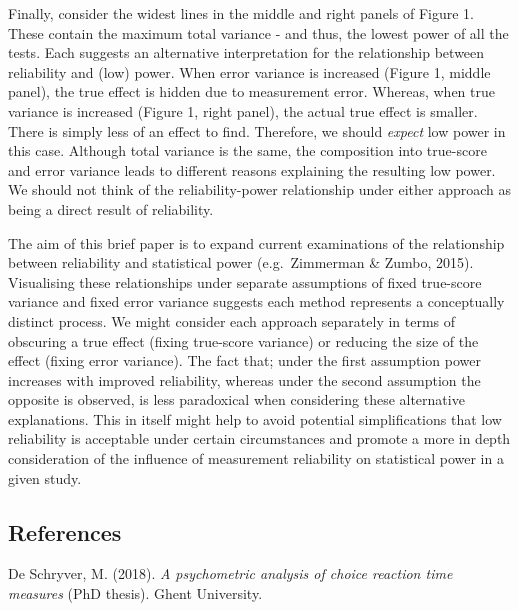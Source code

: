 \documentclass[english,,man]{apa6}
\begin{document}
Finally, consider the widest lines in the middle and right panels of Figure 1. These contain the maximum total variance - and thus, the lowest power of all the tests. Each suggests an alternative interpretation for the relationship between reliability and (low) power. When error variance is increased (Figure 1, middle panel), the true effect is hidden due to measurement error. Whereas, when true variance is increased (Figure 1, right panel), the actual true effect is smaller. There is simply less of an effect to find. Therefore, we should \emph{expect} low power in this case. Although total variance is the same, the composition into true-score and error variance leads to different reasons explaining the resulting low power. We should not think of the reliability-power relationship under either approach as being a direct result of reliability.

The aim of this brief paper is to expand current examinations of the relationship between reliability and statistical power (e.g.~Zimmerman \& Zumbo, 2015). Visualising these relationships under separate assumptions of fixed true-score variance and fixed error variance suggests each method represents a conceptually distinct process. We might consider each approach separately in terms of obscuring a true effect (fixing true-score variance) or reducing the size of the effect (fixing error variance). The fact that; under the first assumption power increases with improved reliability, whereas under the second assumption the opposite is observed, is less paradoxical when considering these alternative explanations. This in itself might help to avoid potential simplifications that low reliability is acceptable under certain circumstances and promote a more in depth consideration of the influence of measurement reliability on statistical power in a given study.

\pagebreak

\hypertarget{references}{%
\subsection{References}\label{references}}

\setlength{\parindent}{-0.4in}
\setlength{\leftskip}{0.4in}
\setlength{\parskip}{8pt}

\noindent

\hypertarget{refs}{}
\leavevmode\hypertarget{ref-DeSchryver2018}{}%
De Schryver, M. (2018). \emph{A psychometric analysis of choice reaction time measures} (PhD thesis). Ghent University.
\end{document}
